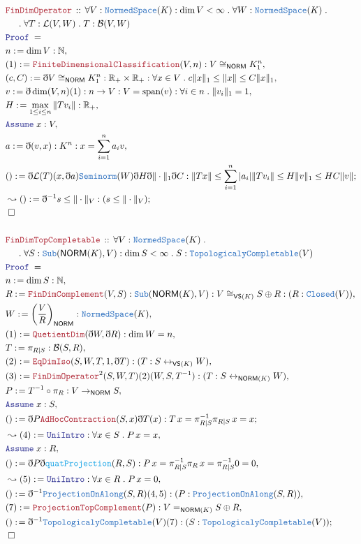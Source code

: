 \documentclass[12pt]{scrartcl}
\newcommand{\TYPE}[1]{\textcolor{NavyBlue}{\mathtt{#1}}}
\newcommand{\FUNC}[1]{\textcolor{Cerulean}{\mathtt{#1}}}
\newcommand{\LOGIC}[1]{\textcolor{Blue}{\mathtt{#1}}}
\newcommand{\THM}[1]{\textcolor{Maroon}{\mathtt{#1}}}
\renewcommand{\.}{\; . \;}
\newcommand{\de}{: \kern 0.1pc =}
\newcommand{\Theorem}[2]{& \THM{#1} \, :: \, #2 \\ & \Proof = \\ }
\newcommand{\NewLine}{\\ & \kern 1pc}
\newcommand{\Page}[1]{\begin{align*} #1 \end{align*} \newpage   }
\newcommand{ \bd }{ \ByDef }
\newcommand{\Reals}{\mathbb{R} }
\newcommand{\Nat}{\mathbb{N} }
\newcommand{\ToBij}{\leftrightarrow}
\newcommand{\Say}[3]{& #1 \de #2 : #3, \\}
\newcommand{\Conclude}[3]{& #1 \de #2 : #3; \\}
\newcommand{\Derive}[3]{& \leadsto #1 \de #2 : #3, \\}
\newcommand{\DeriveConclude}[3]{& \leadsto #1 \de #2 : #3 ; \\}
\newcommand{\A}{\LOGIC{Assume} \;}
\newcommand{\Assume}[2]{& \A #1 : #2, \\}
\newcommand{\QED}{\; \square}
\newcommand{\EndProof}{& \QED \\}
\newcommand{\ByDef}{\eth}
\newcommand{\Proof}{\LOGIC{Proof} \; }
\newcommand{\vs}[1]{\mathsf{VS}\left( #1 \right)}
\DeclareMathOperator{\Span}{span}
\renewcommand{\L}{\mathcal{L}}
\newcommand{\NS}{\TYPE{NormedSpace}}
\newcommand{\TopC}{\TYPE{TopologicalyCompletable}}
\newcommand{\NORM}{\textsf{NORM}}
\newcommand{\B}{\mathcal{B}}
\begin{document}
\Page{
\Theorem{FinDimOperator}{\forall  V : \NS(K) : \dim V < \infty \.
 \forall W : \NS(K) \. 
 \NewLine 
 \. \forall T : \L(V,W) \. T : \B(V,W)
 }
  \Say{n}{\dim V}{\Nat}
  \Say{(1)}{\THM{FiniteDimensionalClassification}(V,n)}{V \cong_{\NORM} K_1^n}
  \Say{(c,C)}{\bd V \cong_{\NORM} K_1^n }{\Reals_+ \times \Reals_+ :
     \forall x \in V \. c\| x \|_1 \le \| x \| \le C\| x \|_1  
  }
  \Say{v}{\bd \dim(V,n)(1)}{ n \to V : V = \Span(v) : \forall i \in n \. \| v_i \|_1 = 1}
  \Say{H}{\max_{1 \le i \le n} \|  T v_i \|}{\Reals_+}
  \Assume{x}{V}
   \Say{ a }{ \bd(v,x)}{ K^n : x = \sum^n_{i = 1} a_i v }
  \Conclude{()}{\bd \L(T)(x,\bd a) \TYPE{Seminorm}(W) \bd H \bd \| \cdot \|_1
  \bd  C 
  }{ \| Tx \| \le \sum^n_{i = 1} |a_i |\| T v_i  \| \le  H \| v \|_1  \le HC \| v \| }
  \DeriveConclude{()}{\bd^{-1} s \le \| \cdot \|_V }{ (s \le \| \cdot \|_V)}
  \EndProof
  \\
  \Theorem{FinDimTopCompletable}{ \forall V : \NS(K) \. \NewLine
  \. \forall S : \TYPE{Sub}(\NORM(K),V) : \dim S < \infty \. S : 
   \TopC(V)
    }
    \Say{n}{\dim S}{\Nat}
    \Say{R}{\THM{FinDimComplement}(V,S)}{ \TYPE{Sub}(\NORM(K),V) : V \cong_{\vs{K}} S \oplus R : (R : \TYPE{Closed}(V)) }
    \Say{W}{\left( \frac{V}{R} \right)_\NORM}{\NS(K)}
    \Say{(1)}{\THM{QuetientDim}(\bd W, \bd R)}{\dim W = n}
    \Say{T}{ \pi_{R|S}}{\B(S,R)}
    \Say{(2)}{\THM{EqDimIso}(S,W,T,1,\bd T) }{(T : S \ToBij_{\vs{K}} W)}
    \Say{(3)}{\THM{FinDimOperator}^2(S, W,T)(2)(W,S,T^{-1})}{(T : S \ToBij_{\NORM(K)} W)}
    \Say{P}{ T^{-1} \circ \pi_R}{ V \to_\NORM S}
    \Assume{x}{S}
    \Conclude{()}{ \bd P \THM{AdHocContraction}(S,x) \bd T (x)}{ T \, x = \pi^{-1}_{R|S} \pi_{R|S} \, x = x}
   \Derive{(4)}{\LOGIC{UniIntro}}{\forall x \in S \. P \, x = x}
   \Assume{x}{R}
   \Say{()}{ \bd P \bd \FUNC{quatProjection}(R,S) }{  P \, x  =  \pi^{-1}_{R|S} \pi_{R} \, x = 
    \pi^{-1}_{R|S} 0 = 0  
   }
   \Derive{(5)}{\LOGIC{UniIntro}}{\forall x \in R \. P \, x = 0}
   \Say{()}{\bd^{-1}\TYPE{ProjectionOnAlong}(S,R)(4,5)}{(P : \TYPE{ProjectionOnAlong}(S,R))}
   \Say{(7)}{\THM{ProjectionTopComplement}(P)}{V =_{\NORM(K)} S \oplus R}
   \Conclude{()}{\bd^{-1} \TopC(V)(7)}{ (S : \TopC(V)) }
   \EndProof
 }
\end{document}
